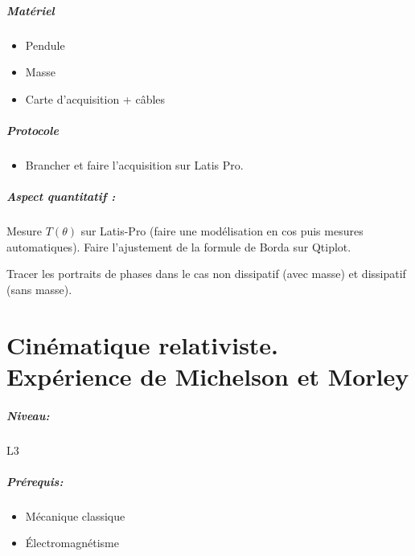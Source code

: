 \documentclass[11pt]{report}
\numberwithin{figure}{section}
\numberwithin{equation}{section}
\numberwithin{table}{section}
\newcommand{\1}{\boldsymbol{1}}
\begin{document}
\begin{tcolorbox}[breakable, enhanced, colback=red!2!white,colframe=mycolor!85!black,title=\textbf{\textbf{Expérience}}]
\paragraph*{Matériel}
\begin{itemize}
\item Pendule
\item Masse
\item Carte d'acquisition + câbles
\end{itemize}

\paragraph*{Protocole } 

\begin{itemize}[label=$\triangleright$]
		\item Brancher et faire l'acquisition sur Latis Pro.
\end{itemize}

\paragraph*{Aspect quantitatif :} Mesure $T(\theta)$ sur Latis-Pro (faire une modélisation en cos puis mesures automatiques). Faire l'ajustement de la formule de Borda sur Qtiplot.

Tracer les portraits de phases dans le cas non dissipatif (avec masse) et dissipatif (sans masse). 


\end{tcolorbox}


\newpage





\chapter{Cinématique relativiste. Expérience de Michelson et Morley}


\paragraph*{Niveau:} L3
\paragraph*{Prérequis:} 
\begin{itemize}
\item Mécanique classique
\item Électromagnétisme
\end{itemize}
\end{document}
